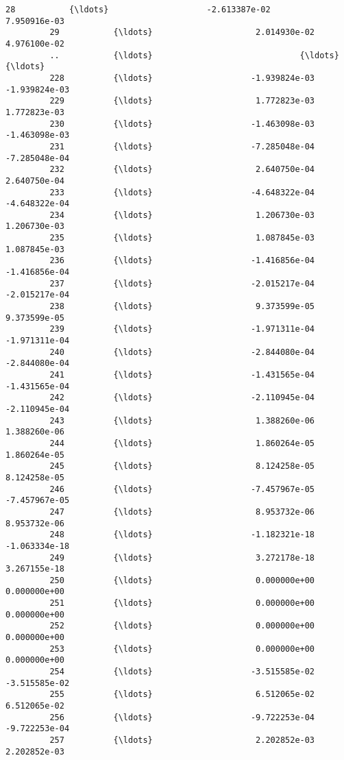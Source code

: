 \documentclass[11pt]{article}
\begin{document}
\begin{Verbatim}[commandchars=\\\{\}]
         28           {\ldots}                    -2.613387e-02           7.950916e-03   
         29           {\ldots}                     2.014930e-02           4.976100e-02   
         ..           {\ldots}                              {\ldots}                    {\ldots}   
         228          {\ldots}                    -1.939824e-03          -1.939824e-03   
         229          {\ldots}                     1.772823e-03           1.772823e-03   
         230          {\ldots}                    -1.463098e-03          -1.463098e-03   
         231          {\ldots}                    -7.285048e-04          -7.285048e-04   
         232          {\ldots}                     2.640750e-04           2.640750e-04   
         233          {\ldots}                    -4.648322e-04          -4.648322e-04   
         234          {\ldots}                     1.206730e-03           1.206730e-03   
         235          {\ldots}                     1.087845e-03           1.087845e-03   
         236          {\ldots}                    -1.416856e-04          -1.416856e-04   
         237          {\ldots}                    -2.015217e-04          -2.015217e-04   
         238          {\ldots}                     9.373599e-05           9.373599e-05   
         239          {\ldots}                    -1.971311e-04          -1.971311e-04   
         240          {\ldots}                    -2.844080e-04          -2.844080e-04   
         241          {\ldots}                    -1.431565e-04          -1.431565e-04   
         242          {\ldots}                    -2.110945e-04          -2.110945e-04   
         243          {\ldots}                     1.388260e-06           1.388260e-06   
         244          {\ldots}                     1.860264e-05           1.860264e-05   
         245          {\ldots}                     8.124258e-05           8.124258e-05   
         246          {\ldots}                    -7.457967e-05          -7.457967e-05   
         247          {\ldots}                     8.953732e-06           8.953732e-06   
         248          {\ldots}                    -1.182321e-18          -1.063334e-18   
         249          {\ldots}                     3.272178e-18           3.267155e-18   
         250          {\ldots}                     0.000000e+00           0.000000e+00   
         251          {\ldots}                     0.000000e+00           0.000000e+00   
         252          {\ldots}                     0.000000e+00           0.000000e+00   
         253          {\ldots}                     0.000000e+00           0.000000e+00   
         254          {\ldots}                    -3.515585e-02          -3.515585e-02   
         255          {\ldots}                     6.512065e-02           6.512065e-02   
         256          {\ldots}                    -9.722253e-04          -9.722253e-04   
         257          {\ldots}                     2.202852e-03           2.202852e-03   
         

\end{Verbatim}
\end{document}
